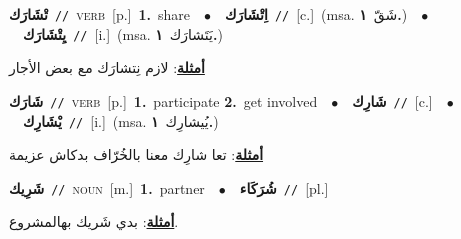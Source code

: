 \documentclass[10pt,a4paper,twoside]{article} %
\begin{document}
\begin{multicols}{2}
{\setlength\topsep{0pt}\textbf{\foreignlanguage{arabic}{تْشَارَك}}\ {\color{gray}\texttt{//}\color{black}}\ \textsc{verb}\ [p.]\ \textbf{1.}~share\ \ $\bullet$\ \ \setlength\topsep{0pt}\textbf{\foreignlanguage{arabic}{اِتْشَارَك}}\ {\color{gray}\texttt{//}\color{black}}\ [c.]\ \color{gray}(msa. \foreignlanguage{arabic}{شَقّ}~\foreignlanguage{arabic}{\textbf{١.}})\color{black}\ \ $\bullet$\ \ \setlength\topsep{0pt}\textbf{\foreignlanguage{arabic}{يِتْشَارَك}}\ {\color{gray}\texttt{//}\color{black}}\ [i.]\ \color{gray}(msa. \foreignlanguage{arabic}{يَتَشارَك}~\foreignlanguage{arabic}{\textbf{١.}})\color{black}\  \begin{flushright}\color{gray}\foreignlanguage{arabic}{\textbf{\underline{\foreignlanguage{arabic}{أمثلة}}}: لازم نِتشارَك مع بعض الأجار}\end{flushright}\color{black}} \vspace{2mm}

{\setlength\topsep{0pt}\textbf{\foreignlanguage{arabic}{شَارَك}}\ {\color{gray}\texttt{//}\color{black}}\ \textsc{verb}\ [p.]\ \textbf{1.}~participate  \textbf{2.}~get involved\ \ $\bullet$\ \ \setlength\topsep{0pt}\textbf{\foreignlanguage{arabic}{شَارِك}}\ {\color{gray}\texttt{//}\color{black}}\ [c.]\ \ $\bullet$\ \ \setlength\topsep{0pt}\textbf{\foreignlanguage{arabic}{يْشَارِك}}\ {\color{gray}\texttt{//}\color{black}}\ [i.]\ \color{gray}(msa. \foreignlanguage{arabic}{يُيشارِك}~\foreignlanguage{arabic}{\textbf{١.}})\color{black}\  \begin{flushright}\color{gray}\foreignlanguage{arabic}{\textbf{\underline{\foreignlanguage{arabic}{أمثلة}}}: تعا شارِك معنا بالخُرّاف بدكاش عزيمة}\end{flushright}\color{black}} \vspace{2mm}

{\setlength\topsep{0pt}\textbf{\foreignlanguage{arabic}{شَرِيك}}\ {\color{gray}\texttt{//}\color{black}}\ \textsc{noun}\ [m.]\ \textbf{1.}~partner\ \ $\bullet$\ \ \setlength\topsep{0pt}\textbf{\foreignlanguage{arabic}{شُرَكَاء}}\ {\color{gray}\texttt{//}\color{black}}\ [pl.]\  \begin{flushright}\color{gray}\foreignlanguage{arabic}{\textbf{\underline{\foreignlanguage{arabic}{أمثلة}}}: بدي شَريك بهالمشروع.}\end{flushright}\color{black}} \vspace{2mm}


\end{multicols}
\end{document}
